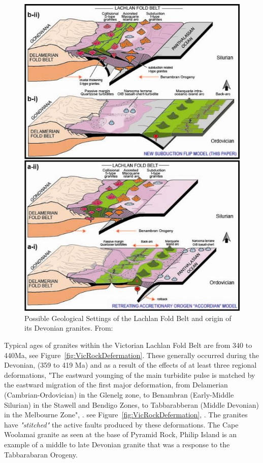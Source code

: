 \documentclass[a4paper]{article}
\begin{document}
\begin{figure}[H]
\centering
\includegraphics[width=1\textwidth]{granite_models.jpg}
\caption{\label{fig:GraniteModels} Possible Geological Settings of the Lachlan Fold Belt and origin of its Devonian granites. From: \cite{aitchison2012accordion}}
\end{figure}


Typical ages of granites within the Victorian Lachlan Fold Belt are from 340 to 440Ma, see  Figure~\ref{fig:VicRockDefermation}. These generally occurred during the Devonian, (359 to 419 Ma) and as a result of the effects of at least three regional deformations, "The eastward younging of the main turbidite pulse is matched by the eastward migration of the first major deformation, from Delamerian (Cambrian-Ordovician) in the Glenelg zone, to Benambran (Early-Middle Silurian) in the Stawell and Bendigo Zones, to Tabbarabberan (Middle Devonian) in the Melbourne Zone", \cite{moorel1998palaeozoic}. see  Figure~\ref{fig:VicRockDefermation}, \cite{moorel1998palaeozoic}. The granites have \textit{"stitched"} the active faults produced by these deformations. The Cape Woolamai granite as seen at the base of Pyramid Rock, Philip Island is an example of a middle to late Devonian granite that was a response to the Tabbarabaran Orogeny.
\end{document}
